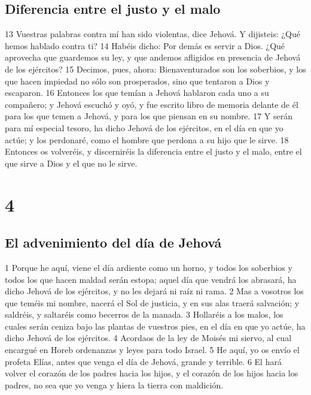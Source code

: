 \section*{Diferencia entre el justo y el malo}

13 Vuestras palabras contra mí han sido violentas, dice Jehová. Y dijisteis: ¿Qué hemos hablado contra ti?
14 Habéis dicho: Por demás es servir a Dios. ¿Qué aprovecha que guardemos su ley, y que andemos afligidos en presencia de Jehová de los ejércitos?
15 Decimos, pues, ahora: Bienaventurados son los soberbios, y los que hacen impiedad no sólo son prosperados, sino que tentaron a Dios y escaparon.
16 Entonces los que temían a Jehová hablaron cada uno a su compañero; y Jehová escuchó y oyó, y fue escrito libro de memoria delante de él para los que temen a Jehová, y para los que piensan en su nombre.
17 Y serán para mí especial tesoro, ha dicho Jehová de los ejércitos, en el día en que yo actúe; y los perdonaré, como el hombre que perdona a su hijo que le sirve.
18 Entonces os volveréis, y discerniréis la diferencia entre el justo y el malo, entre el que sirve a Dios y el que no le sirve.

\chapter{4}

\section*{El advenimiento del día de Jehová}

1 Porque he aquí, viene el día ardiente como un horno, y todos los soberbios y todos los que hacen maldad serán estopa; aquel día que vendrá los abrasará, ha dicho Jehová de los ejércitos, y no les dejará ni raíz ni rama.
2 Mas a vosotros los que teméis mi nombre, nacerá el Sol de justicia, y en sus alas traerá salvación; y saldréis, y saltaréis como becerros de la manada.
3 Hollaréis a los malos, los cuales serán ceniza bajo las plantas de vuestros pies, en el día en que yo actúe, ha dicho Jehová de los ejércitos. 
4 Acordaos de la ley de Moisés mi siervo, al cual encargué en Horeb ordenanzas y leyes para todo Israel.
5 He aquí, yo os envío el profeta Elías, antes que venga el día de Jehová, grande y terrible.
6 El hará volver el corazón de los padres hacia los hijos, y el corazón de los hijos hacia los padres, no sea que yo venga y hiera la tierra con maldición.


